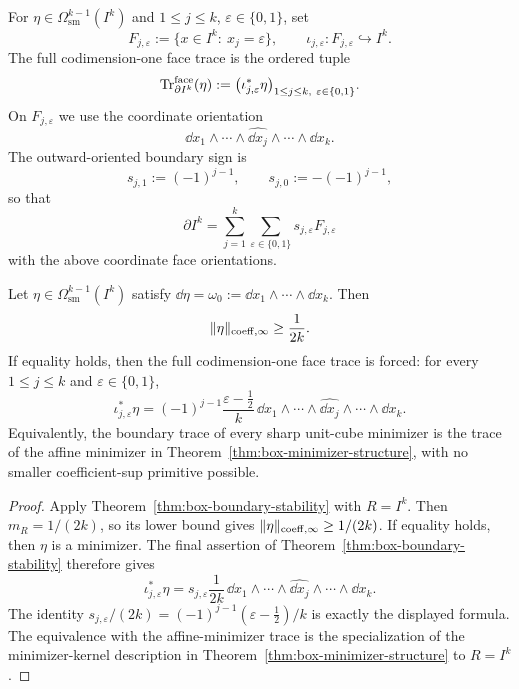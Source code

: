 \begin{definition}
\label{def:face-trace}
For $\eta\in\Omega^{k-1}_{\mathrm{sm}}(I^k)$ and
$1\le j\le k$, $\varepsilon\in\{0,1\}$, set
\[
F_{j,\varepsilon}:=\{x\in I^k:\ x_j=\varepsilon\},
\qquad
\iota_{j,\varepsilon}:F_{j,\varepsilon}\hookrightarrow I^k .
\]
The full codimension-one face trace is the ordered tuple
\[
\operatorname{Tr}_{\partial I^k}^{\mathrm{face}}(\eta)
:=
\bigl(\iota_{j,\varepsilon}^\ast\eta\bigr)_{
1\le j\le k,\ \varepsilon\in\{0,1\}}.
\]
On $F_{j,\varepsilon}$ we use the coordinate orientation
\[
\dd x_1\wedge\cdots\wedge\widehat{\dd x_j}\wedge\cdots\wedge\dd x_k.
\]
The outward-oriented boundary sign is
\[
s_{j,1}:=(-1)^{j-1},
\qquad
s_{j,0}:=-(-1)^{j-1},
\]
so that
\[
\partial I^k=
\sum_{j=1}^k\sum_{\varepsilon\in\{0,1\}}
s_{j,\varepsilon}F_{j,\varepsilon}
\]
with the above coordinate face orientations.
\end{definition}

\begin{theorem}
\label{thm:boundary-rigidity}
Let $\eta\in\Omega^{k-1}_{\mathrm{sm}}(I^k)$ satisfy
$\dd\eta=\omega_0:=\dd x_1\wedge\cdots\wedge\dd x_k$. Then
\[
\lVert \eta \rVert_{\mathrm{coeff},\infty}\ge \frac1{2k}.
\]
If equality holds, then the full codimension-one face trace is forced: for every
$1\le j\le k$ and $\varepsilon\in\{0,1\}$,
\[
\iota_{j,\varepsilon}^\ast\eta
=
(-1)^{j-1}\frac{\varepsilon-\frac12}{k}\,
\dd x_1\wedge\cdots\wedge\widehat{\dd x_j}\wedge\cdots\wedge\dd x_k .
\]
Equivalently, the boundary trace of every sharp unit-cube minimizer is the
trace of the affine minimizer in Theorem~\ref{thm:box-minimizer-structure},
with no smaller coefficient-sup primitive possible.
\end{theorem}

\begin{proof}
Apply Theorem~\ref{thm:box-boundary-stability} with $R=I^k$. Then
$m_R=1/(2k)$, so its lower bound gives
$\lVert \eta \rVert_{\mathrm{coeff},\infty}\ge1/(2k)$. If equality holds, then $\eta$ is a
minimizer. The final assertion of Theorem~\ref{thm:box-boundary-stability}
therefore gives
\[
\iota_{j,\varepsilon}^\ast\eta
=s_{j,\varepsilon}\frac{1}{2k}\,
\dd x_1\wedge\cdots\wedge\widehat{\dd x_j}\wedge\cdots\wedge\dd x_k .
\]
The identity
$s_{j,\varepsilon}/(2k)=(-1)^{j-1}(\varepsilon-\frac12)/k$ is exactly the
displayed formula. The equivalence with the affine-minimizer trace is the
specialization of the minimizer-kernel description in
Theorem~\ref{thm:box-minimizer-structure} to $R=I^k$.
\end{proof}

